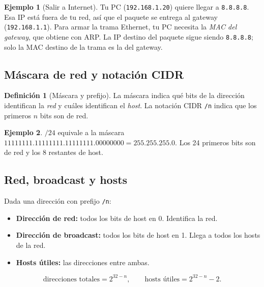 \documentclass[11pt,a4paper]{article}
\theoremstyle{definition}
\newtheorem{definicion}{Definición}[section]
\newtheorem{ejemplo}{Ejemplo}[section]
\theoremstyle{remark}
\begin{document}
\begin{ejemplo}[Salir a Internet]
Tu PC (\texttt{192.168.1.20}) quiere llegar a \texttt{8.8.8.8}. Esa IP está fuera de tu red, así que el paquete se entrega al gateway (\texttt{192.168.1.1}). Para armar la trama Ethernet, tu PC necesita la \emph{MAC del gateway}, que obtiene con ARP. La IP destino del paquete sigue siendo \texttt{8.8.8.8}; solo la MAC destino de la trama es la del gateway.
\end{ejemplo}

\subsection{Máscara de red y notación CIDR}

\begin{definicion}[Máscara y prefijo]
La máscara indica qué bits de la dirección identifican la \emph{red} y cuáles identifican el \emph{host}. La notación CIDR \texttt{/n} indica que los primeros $n$ bits son de red.
\end{definicion}

\begin{ejemplo}
$/24$ equivale a la máscara $11111111.11111111.11111111.00000000 = 255.255.255.0$. Los 24 primeros bits son de red y los 8 restantes de host.
\end{ejemplo}

\subsection{Red, broadcast y hosts}

Dada una dirección con prefijo \texttt{/n}:

\begin{itemize}
  \item \textbf{Dirección de red:} todos los bits de host en 0. Identifica la red.
  \item \textbf{Dirección de broadcast:} todos los bits de host en 1. Llega a todos los hosts de la red.
  \item \textbf{Hosts útiles:} las direcciones entre ambas.
\end{itemize}

\[
\text{direcciones totales} = 2^{32-n}, \qquad
\text{hosts útiles} = 2^{32-n}-2 .
\]
\end{document}

